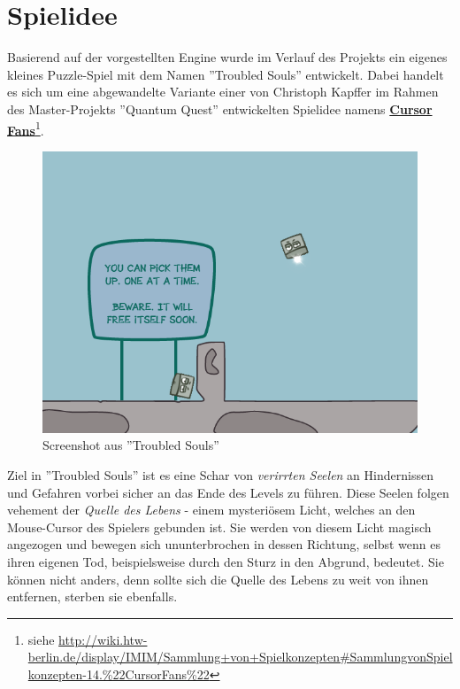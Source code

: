 \chapter{Spielidee}

Basierend auf der vorgestellten Engine wurde im Verlauf des Projekts ein eigenes kleines Puzzle-Spiel mit dem Namen ''Troubled Souls'' entwickelt. Dabei handelt es sich um eine abgewandelte Variante einer von Christoph Kapffer im Rahmen des Master-Projekts ''Quantum Quest'' entwickelten Spielidee namens \textbf{\href{http://wiki.htw-berlin.de/display/IMIM/Sammlung+von+Spielkonzepten\#SammlungvonSpielkonzepten-14.\%22CursorFans\%22}{Cursor Fans}}\footnote{siehe \url{http://wiki.htw-berlin.de/display/IMIM/Sammlung+von+Spielkonzepten\#SammlungvonSpielkonzepten-14.\%22CursorFans\%22}}.

\begin{figure}[h] %
	\centering
		\includegraphics[scale=0.6]{images/screenshot_game.png}
	\caption{Screenshot aus ''Troubled Souls''}
\end{figure}

Ziel in ''Troubled Souls'' ist es eine Schar von \textit{verirrten Seelen} an Hindernissen und Gefahren vorbei sicher an das Ende des Levels zu führen. Diese Seelen folgen vehement der \textit{Quelle des Lebens} - einem mysteriösem Licht, welches an den Mouse-Cursor des Spielers gebunden ist. Sie werden von diesem Licht magisch angezogen und bewegen sich ununterbrochen in dessen Richtung, selbst wenn es ihren eigenen Tod, beispielsweise durch den Sturz in den Abgrund, bedeutet. Sie können nicht anders, denn sollte sich die Quelle des Lebens zu weit von ihnen entfernen, sterben sie ebenfalls.


